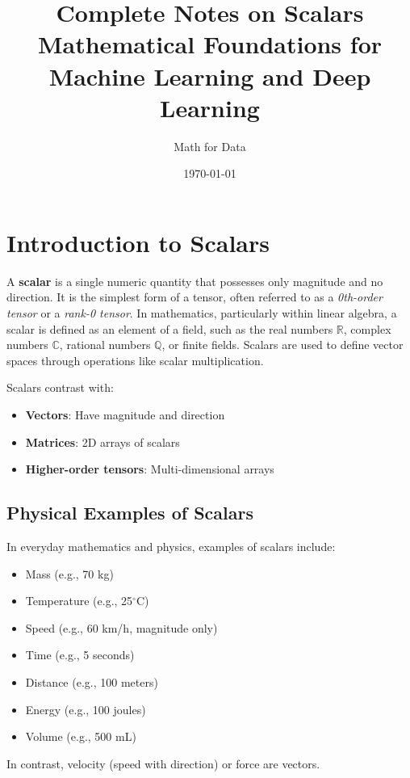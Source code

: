 \documentclass[11pt,a4paper]{article}
\title{\textbf{Complete Notes on Scalars} \\ 
\large Mathematical Foundations for Machine Learning and Deep Learning}
\author{Math for Data}
\date{\today}
\begin{document}
\maketitle
\tableofcontents
\newpage

\section{Introduction to Scalars}

A \textbf{scalar} is a single numeric quantity that possesses only magnitude and no direction. It is the simplest form of a tensor, often referred to as a \textit{0th-order tensor} or a \textit{rank-0 tensor}. In mathematics, particularly within linear algebra, a scalar is defined as an element of a field, such as the real numbers $\mathbb{R}$, complex numbers $\mathbb{C}$, rational numbers $\mathbb{Q}$, or finite fields. Scalars are used to define vector spaces through operations like scalar multiplication.

Scalars contrast with:
\begin{itemize}
    \item \textbf{Vectors}: Have magnitude and direction
    \item \textbf{Matrices}: 2D arrays of scalars
    \item \textbf{Higher-order tensors}: Multi-dimensional arrays
\end{itemize}

\subsection{Physical Examples of Scalars}

In everyday mathematics and physics, examples of scalars include:
\begin{itemize}
    \item Mass (e.g., 70 kg)
    \item Temperature (e.g., 25$^\circ$C)
    \item Speed (e.g., 60 km/h, magnitude only)
    \item Time (e.g., 5 seconds)
    \item Distance (e.g., 100 meters)
    \item Energy (e.g., 100 joules)
    \item Volume (e.g., 500 mL)
\end{itemize}

In contrast, velocity (speed with direction) or force are vectors.
\end{document}

